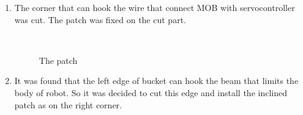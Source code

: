 \begin{enumerate}
\begin{enumerate}
		\item The corner that can hook the wire that connect MOB with servocontroller was cut. The patch was fixed on the cut part.
		 		         \begin{figure}[H]
		 		         	\begin{minipage}[h]{0.2\linewidth}
		 		         		\center  
		 		         	\end{minipage}
		 		         	\begin{minipage}[h]{0.6\linewidth}
		 		         		\caption{The patch}
		 		         	\end{minipage}
		 		         \end{figure}
		\item It was found that the left edge of bucket can hook the beam that limits the body of robot. So it was decided to cut this edge and install the inclined patch as on the right corner.		  		 		         				 		         	 		         	 		 		         		 
		 			 		         

\end{enumerate}
\end{enumerate}
